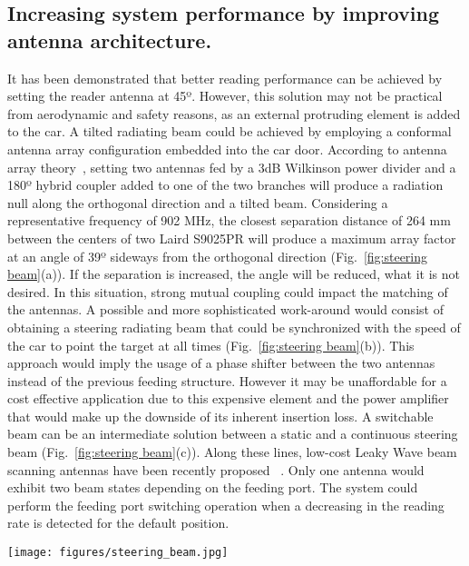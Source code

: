 \documentclass[lettersize,journal]{IEEEtran}
\begin{document}
\subsection{Increasing system performance by improving antenna architecture.}
It has been demonstrated that better reading performance can be achieved by setting the reader antenna at 45º. However, this solution may not be practical from aerodynamic and safety reasons, as an external protruding element is added to the car.  A tilted radiating beam could be achieved by employing a conformal antenna array configuration embedded into the car door. According to antenna array theory~\cite{Balanis-2012-antenna}, setting two antennas fed by a 3dB Wilkinson power divider and a 180º hybrid coupler added to one of the two branches will produce a radiation null along the orthogonal direction and a tilted beam. Considering a representative frequency of 902 MHz, the closest separation distance of 264 mm between the centers of two Laird S9025PR will produce a maximum array factor at an angle of 39º sideways from the orthogonal direction (Fig.~\ref{fig:steering beam}(a)). If the separation is increased, the angle will be reduced, what it is not desired. In this situation, strong mutual coupling could impact the matching of the antennas. A possible and more sophisticated work-around would consist of obtaining a steering radiating beam that could be synchronized with the speed of the car to point the target at all times (Fig.~\ref{fig:steering beam}(b)). This approach would imply the usage of a phase shifter between the two antennas instead of the previous feeding structure. However it may be unaffordable for a cost effective application due to this expensive element and the power amplifier that would make up the downside of its inherent insertion loss. A switchable beam can be an intermediate solution between a static and a continuous steering beam (Fig.~\ref{fig:steering beam}(c)). Along these lines, low-cost Leaky Wave beam scanning antennas have been recently proposed ~\cite{10133315}. Only one antenna would exhibit two beam states depending on the feeding port. The system could perform the feeding port switching operation when a decreasing in the reading rate is detected for the default position.
\begin{figure*}[tb!]
\centering
\texttt{[image: figures/steering\_beam.jpg]}
\caption{Proposed antenna system architectures: two adjacent commercial Laird antennas out of phase (a) and with phase shifter (b), a Leaky Wave antenna ~\cite{10133315} with switching feeding port.}
\label{fig:steering beam}
\end{figure*}
\end{document}
